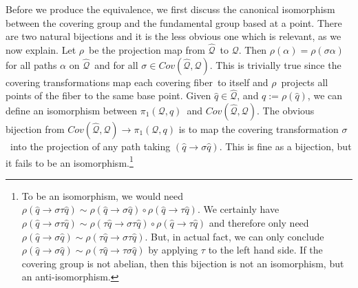 \documentclass[11pt]{article}
\theoremstyle{remark}
\begin{document}
Before we produce the equivalence, we first discuss the 
canonical isomorphism
between the covering group and the fundamental group based at a point. There
are two natural bijections and it is the less obvious one which is
relevant, as we now explain. 
Let \ensuremath{\ensuremath{\rho}}\ be the projection  map
from \ensuremath{\widehat{\ensuremath{\mathcal{Q}}}}\ to \ensuremath{\mathcal{Q}}. Then $\ensuremath{\ensuremath{\rho}}(\alpha)  = \ensuremath{\ensuremath{\rho}}(\ensuremath{\sigma}
\alpha)$ for all paths $\alpha$ on \ensuremath{\widehat{\ensuremath{\mathcal{Q}}}}\ and for all $\ensuremath{\sigma} \in
\ensuremath{Cov(\ensuremath{\widehat{\ensuremath{\mathcal{Q}}}}, \ensuremath{\mathcal{Q}})}$. This is trivially true since the covering transformations map
each covering fiber\ to itself and \ensuremath{\ensuremath{\rho}}\ projects all points of the fiber to
the same base point. Given $\ensuremath{\hat{q}} \in
\ensuremath{\widehat{\ensuremath{\mathcal{Q}}}}$, and $\ensuremath{q} \ensuremath{:=} \ensuremath{\ensuremath{\rho}}(\ensuremath{\hat{q}})$, we can define
an isomorphism between \ensuremath{\pi_1 ({\ensuremath{\mathcal{Q}}, \ensuremath{q}})}\ and \ensuremath{Cov(\ensuremath{\widehat{\ensuremath{\mathcal{Q}}}}, \ensuremath{\mathcal{Q}})}. The obvious
bijection from $\ensuremath{Cov(\ensuremath{\widehat{\ensuremath{\mathcal{Q}}}}, \ensuremath{\mathcal{Q}})} \to \ensuremath{\pi_1 ({\ensuremath{\mathcal{Q}}, \ensuremath{q}})}$ 
is to map the covering transformation \ensuremath{\sigma}\ into the
projection of any path taking $(\ensuremath{\hat{q}} \to \ensuremath{\sigma} \ensuremath{\hat{q}})$. This is fine
as a bijection, but it fails to be an isomorphism.\footnote{To be an
  isomorphism, we would need $\ensuremath{\ensuremath{\rho}}(\ensuremath{\hat{q}} \to \ensuremath{\sigma} \tau \ensuremath{\hat{q}}) \ensuremath{\sim}
  \ensuremath{\ensuremath{\rho}}(\ensuremath{\hat{q}} \to \ensuremath{\sigma} \ensuremath{\hat{q}}) \circ \ensuremath{\ensuremath{\rho}}(\ensuremath{\hat{q}} \to \tau
  \ensuremath{\hat{q}})$. We certainly have $\ensuremath{\ensuremath{\rho}}(\ensuremath{\hat{q}} \to \ensuremath{\sigma} \tau \ensuremath{\hat{q}}) \ensuremath{\sim}
  \ensuremath{\ensuremath{\rho}}(\tau \ensuremath{\hat{q}} \to \ensuremath{\sigma} \tau \ensuremath{\hat{q}}) \circ \ensuremath{\ensuremath{\rho}}(\ensuremath{\hat{q}} \to \tau
  \ensuremath{\hat{q}})$ and therefore only need
   $\ensuremath{\ensuremath{\rho}}(\ensuremath{\hat{q}} \to \ensuremath{\sigma} \ensuremath{\hat{q}})
  \ensuremath{\sim} \ensuremath{\ensuremath{\rho}}(\tau \ensuremath{\hat{q}} \to \ensuremath{\sigma} \tau \ensuremath{\hat{q}})$. But, in actual fact,
  we can only conclude $\ensuremath{\ensuremath{\rho}}(\ensuremath{\hat{q}} \to \ensuremath{\sigma} \ensuremath{\hat{q}})
  \ensuremath{\sim} \ensuremath{\ensuremath{\rho}}(\tau \ensuremath{\hat{q}} \to \tau \ensuremath{\sigma} \ensuremath{\hat{q}})$ by applying $\tau$ to
  the left hand side. If the covering group is not abelian, then this
bijection is not an isomorphism, but an anti-isomorphism.} 
\end{document}

